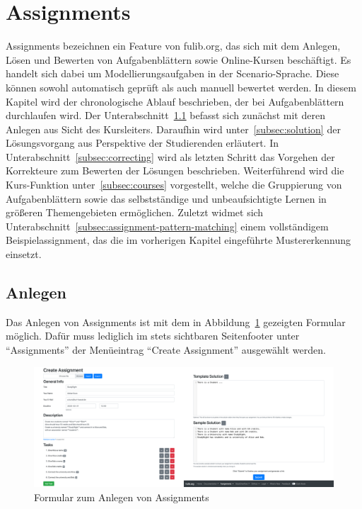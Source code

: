 \section{Assignments}\label{sec:assignments}

Assignments bezeichnen ein Feature von fulib.org, das sich mit dem Anlegen, Lösen und Bewerten von Aufgabenblättern sowie Online-Kursen beschäftigt.
Es handelt sich dabei um Modellierungsaufgaben in der Scenario-Sprache.
Diese können sowohl automatisch geprüft als auch manuell bewertet werden.
In diesem Kapitel wird der chronologische Ablauf beschrieben, der bei Aufgabenblättern durchlaufen wird.
Der Unterabschnitt~\ref{subsec:creation} befasst sich zunächst mit deren Anlegen aus Sicht des Kursleiters.
Daraufhin wird unter~\ref{subsec:solution} der Lösungsvorgang aus Perspektive der Studierenden erläutert.
In Unterabschnitt~\ref{subsec:correcting} wird als letzten Schritt das Vorgehen der Korrekteure zum Bewerten der Lösungen beschrieben.
Weiterführend wird die Kurs-Funktion unter~\ref{subsec:courses} vorgestellt, welche die Gruppierung von Aufgabenblättern sowie das selbstständige und unbeaufsichtigte Lernen in größeren Themengebieten ermöglichen.
Zuletzt widmet sich Unterabschnitt~\ref{subsec:assignment-pattern-matching} einem vollständigem Beispielassignment, das die im vorherigen Kapitel eingeführte Mustererkennung einsetzt.

\subsection{Anlegen}\label{subsec:creation}

Das Anlegen von Assignments ist mit dem in Abbildung~\ref{fig:create-assignment} gezeigten Formular möglich.
Dafür muss lediglich im stets sichtbaren Seitenfooter unter ``Assignments'' der Menüeintrag ``Create Assignment'' ausgewählt werden.

\begin{figure}
    \centering
    \includegraphics[width=\textwidth]{chapter/fulib.org/img/create-assignment.png}
    \caption{Formular zum Anlegen von Assignments}
    \label{fig:create-assignment}
\end{figure}

